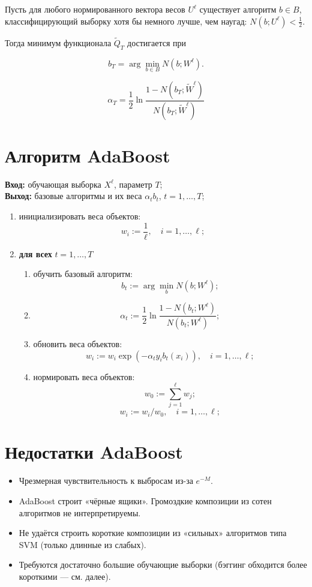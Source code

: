 Пусть для любого нормированного вектора весов $U^\ell$ существует алгоритм $b \in B$, классифицирующий выборку хотя бы немного лучше, чем наугад: $N(b; U^\ell) < \frac{1}{2}$.

Тогда минимум функционала $\tilde{Q}_T$ достигается при

\[
b_T = \arg \min_{b \in B} N(b; W^\ell).
\]

\[
\alpha_T = \frac{1}{2} \ln \frac{1 - N(b_T; \tilde{W}^\ell)}{N(b_T; \tilde{W}^\ell)}
\]


\section*{Алгоритм AdaBoost}

\textbf{Вход:} обучающая выборка $X^\ell$, параметр $T$;\\
\textbf{Выход:} базовые алгоритмы и их веса $\alpha_t b_t$, $t = 1, \ldots, T$;

\begin{enumerate}
    \item инициализировать веса объектов:
    \[
    w_i := \frac{1}{\ell}, \quad i = 1, \ldots, \ell;
    \]
    \item \textbf{для всех} $t = 1, \ldots, T$
    \begin{enumerate}
        \item обучить базовый алгоритм:
        \[
        b_t := \arg \min_b N(b; W^\ell);
        \]
        \item 
        \[
        \alpha_t := \frac{1}{2} \ln \frac{1 - N(b_t; W^\ell)}{N(b_t; W^\ell)};
        \]
        \item обновить веса объектов:
        \[
        w_i := w_i \exp(-\alpha_t y_i b_t(x_i)), \quad i = 1, \ldots, \ell;
        \]
        \item нормировать веса объектов:
        \[
        w_0 := \sum_{j=1}^{\ell} w_j;
        \]
        \[
        w_i := w_i / w_0, \quad i = 1, \ldots, \ell;
        \]
    \end{enumerate}
\end{enumerate}

\section*{Недостатки AdaBoost}

\begin{itemize}
    \item Чрезмерная чувствительность к выбросам из-за $e^{-M}$.
    \item AdaBoost строит «чёрные ящики». Громоздкие композиции из сотен алгоритмов не интерпретируемы.
    \item Не удаётся строить короткие композиции из «сильных» алгоритмов типа SVM (только длинные из слабых).
    \item Требуются достаточно большие обучающие выборки (бэггинг обходится более короткими — см. далее).
\end{itemize}

